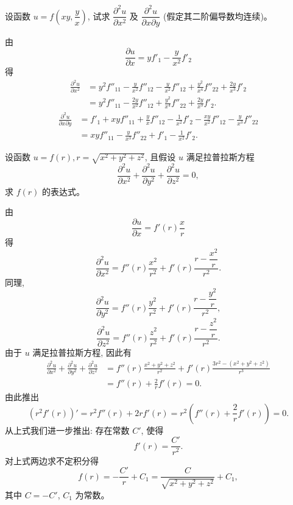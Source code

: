 \documentclass[12pt,fontset=fandol]{ctexart}
\begin{document}
\begin{example}\label{course-example-14-2-8}\quad 设函数 $u=f\left(xy,\dfrac yx\right)$, 试求 $\dfrac{\partial^2u}{\partial x^2}$ 及 $\dfrac{\partial^2u}{\partial x\partial y}$ (假定其二阶偏导数均连续)。

\end{example}
\begin{solve}\quad 由
\[
  \frac{\partial u}{\partial x}=yf'_1-\frac y{x^2}f'_2
\]
得
\[
\begin{aligned}
  \frac{\partial^2u}{\partial x^2}
  &=y^2f''_{11}-\frac y{x^2}f''_{12}
  -\frac y{x^2}f''_{12}+\frac{y^2}{x^4}f''_{22}
  +\frac{2y}{x^3}f'_2\\
  &=y^2f''_{11}-\frac{2y}{x^2}f''_{12}
  +\frac{y^2}{x^4}f''_{22}+\frac{2y}{x^3}f'_2.
\end{aligned}
\]
\[
\begin{aligned}
  \frac{\partial^2u}{\partial x\partial y}
  &=f'_1+xyf''_{11}+\frac yx f''_{12}
  -\frac1{x^2}f'_2-\frac{xy}{x^2}f''_{12}
  -\frac y{x^3}f''_{22}\\
  &=xyf''_{11}-\frac y{x^3}f''_{22}+f'_1-\frac1{x^2}f'_2.
\end{aligned}
\]

\end{solve}
\begin{example}\label{course-example-14-2-9}\quad 设函数 $u=f(r),r=\sqrt{x^2+y^2+z^2}$, 且假设 $u$ 满足拉普拉斯方程
\[
  \frac{\partial^2u}{\partial x^2}
  +\frac{\partial^2u}{\partial y^2}
  +\frac{\partial^2u}{\partial z^2}=0,
\]
求 $f(r)$ 的表达式。

\end{example}
\begin{solve}\quad 由
\[
  \frac{\partial u}{\partial x}=f'(r)\frac xr
\]
得
\[
  \frac{\partial^2u}{\partial x^2}
  =f''(r)\frac{x^2}{r^2}+f'(r)\frac{r-\dfrac{x^2}{r}}{r^2}.
\]
同理,
\[
  \frac{\partial^2u}{\partial y^2}
  =f''(r)\frac{y^2}{r^2}+f'(r)\frac{r-\dfrac{y^2}{r}}{r^2},
\]
\[
  \frac{\partial^2u}{\partial z^2}
  =f''(r)\frac{z^2}{r^2}+f'(r)\frac{r-\dfrac{z^2}{r}}{r^2}.
\]
由于 $u$ 满足拉普拉斯方程, 因此有
\[
\begin{aligned}
  \frac{\partial^2u}{\partial x^2}
  +\frac{\partial^2u}{\partial y^2}
  +\frac{\partial^2u}{\partial z^2}
  &=f''(r)\frac{x^2+y^2+z^2}{r^2}
  +f'(r)\frac{3r^2-(x^2+y^2+z^2)}{r^3}\\
  &=f''(r)+\frac2r f'(r)=0.
\end{aligned}
\]
由此推出
\[
  (r^2f'(r))'=r^2f''(r)+2rf'(r)
  =r^2\left(f''(r)+\frac2r f'(r)\right)=0.
\]
从上式我们进一步推出: 存在常数 $C'$, 使得
\[
  f'(r)=\frac{C'}{r^2}.
\]
对上式两边求不定积分得
\[
  f(r)=-\frac{C'}r+C_1=\frac C{\sqrt{x^2+y^2+z^2}}+C_1,
\]
其中 $C=-C'$, $C_1$ 为常数。

\end{solve}
\end{document}
